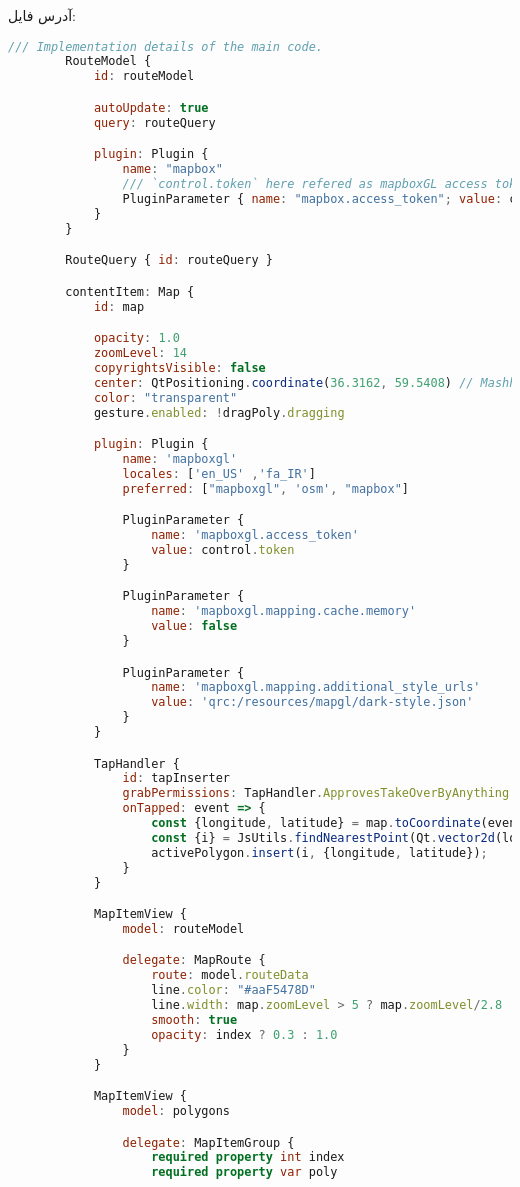 آدرس فایل:
\hyperref{https://github.com/cardianco/cardian/blob/master/cardian/pages/NavigationPage.qml}{}{}{}
\begin{latin}
	\small
	\begin{lstlisting}[language=qml, caption={Navigation Page}]
		/// Implementation details of the main code.
		RouteModel {
			id: routeModel

			autoUpdate: true
			query: routeQuery

			plugin: Plugin {
				name: "mapbox"
				/// `control.token` here refered as mapboxGL access token.
				PluginParameter { name: "mapbox.access_token"; value: control.token }
			}
		}

		RouteQuery { id: routeQuery }

		contentItem: Map {
			id: map

			opacity: 1.0
			zoomLevel: 14
			copyrightsVisible: false
			center: QtPositioning.coordinate(36.3162, 59.5408) // Mashhad (Default location, clould also be Tehran)
			color: "transparent"
			gesture.enabled: !dragPoly.dragging

			plugin: Plugin {
				name: 'mapboxgl'
				locales: ['en_US' ,'fa_IR']
				preferred: ["mapboxgl", 'osm', "mapbox"]

				PluginParameter {
					name: 'mapboxgl.access_token'
					value: control.token
				}

				PluginParameter {
					name: 'mapboxgl.mapping.cache.memory'
					value: false
				}

				PluginParameter {
					name: 'mapboxgl.mapping.additional_style_urls'
					value: 'qrc:/resources/mapgl/dark-style.json'
				}
			}

			TapHandler {
				id: tapInserter
				grabPermissions: TapHandler.ApprovesTakeOverByAnything
				onTapped: event => {
					const {longitude, latitude} = map.toCoordinate(event.position);
					const {i} = JsUtils.findNearestPoint(Qt.vector2d(longitude, latitude), activePolygon);
					activePolygon.insert(i, {longitude, latitude});
				}
			}

			MapItemView {
				model: routeModel

				delegate: MapRoute {
					route: model.routeData
					line.color: "#aaF5478D"
					line.width: map.zoomLevel > 5 ? map.zoomLevel/2.8 : 0
					smooth: true
					opacity: index ? 0.3 : 1.0
				}
			}

			MapItemView {
				model: polygons

				delegate: MapItemGroup {
					required property int index
					required property var poly


\end{lstlisting}
\end{latin}
